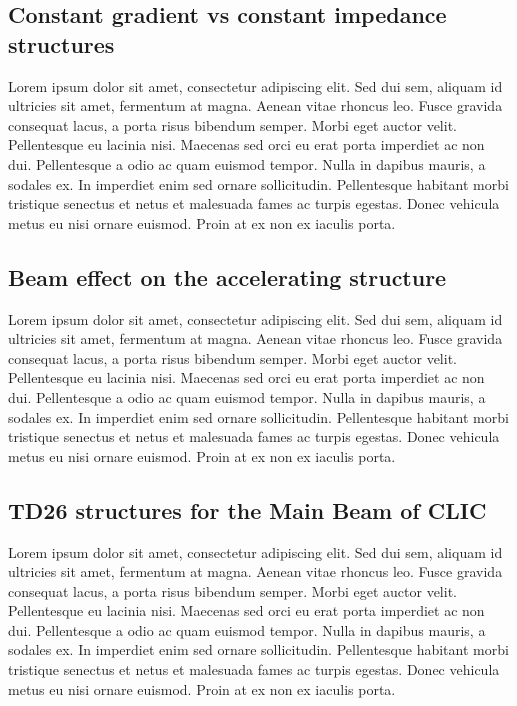 \cite{Botta:EM}




\subsection[Constant gradient vs constant impedance structures]{Constant gradient vs constant impedance structures}
Lorem ipsum dolor sit amet, consectetur adipiscing elit. Sed dui sem, aliquam id ultricies sit amet, fermentum at magna. Aenean vitae rhoncus leo. Fusce gravida consequat lacus, a porta risus bibendum semper. Morbi eget auctor velit. Pellentesque eu lacinia nisi. Maecenas sed orci eu erat porta imperdiet ac non dui. Pellentesque a odio ac quam euismod tempor. Nulla in dapibus mauris, a sodales ex. In imperdiet enim sed ornare sollicitudin. Pellentesque habitant morbi tristique senectus et netus et malesuada fames ac turpis egestas. Donec vehicula metus eu nisi ornare euismod. Proin at ex non ex iaculis porta.

\subsection[Beam effect on the accelerating structure]{Beam effect on the accelerating structure}
Lorem ipsum dolor sit amet, consectetur adipiscing elit. Sed dui sem, aliquam id ultricies sit amet, fermentum at magna. Aenean vitae rhoncus leo. Fusce gravida consequat lacus, a porta risus bibendum semper. Morbi eget auctor velit. Pellentesque eu lacinia nisi. Maecenas sed orci eu erat porta imperdiet ac non dui. Pellentesque a odio ac quam euismod tempor. Nulla in dapibus mauris, a sodales ex. In imperdiet enim sed ornare sollicitudin. Pellentesque habitant morbi tristique senectus et netus et malesuada fames ac turpis egestas. Donec vehicula metus eu nisi ornare euismod. Proin at ex non ex iaculis porta.



\subsection[TD26 structures for the Main Beam of CLIC]{TD26 structures for the Main Beam of CLIC}
Lorem ipsum dolor sit amet, consectetur adipiscing elit. Sed dui sem, aliquam id ultricies sit amet, fermentum at magna. Aenean vitae rhoncus leo. Fusce gravida consequat lacus, a porta risus bibendum semper. Morbi eget auctor velit. Pellentesque eu lacinia nisi. Maecenas sed orci eu erat porta imperdiet ac non dui. Pellentesque a odio ac quam euismod tempor. Nulla in dapibus mauris, a sodales ex. In imperdiet enim sed ornare sollicitudin. Pellentesque habitant morbi tristique senectus et netus et malesuada fames ac turpis egestas. Donec vehicula metus eu nisi ornare euismod. Proin at ex non ex iaculis porta.



